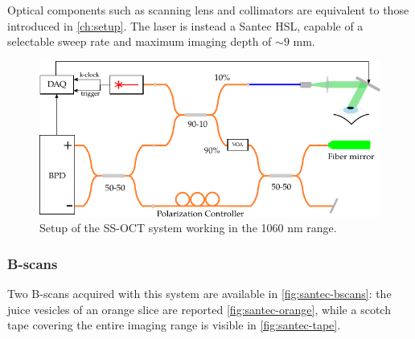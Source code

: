 Optical components such as scanning lens and collimators are equivalent to those introduced in \autoref{ch:setup}. The laser is instead a Santec HSL, capable of a selectable sweep rate and maximum imaging depth of $\sim 9$ mm. 


\begin{figure}[H]
	\centering
	\includegraphics[width=\linewidth]{gfx/ch4//santec-setup}
	\caption{Setup of the SS-OCT system working in the 1060 nm range.}\label{fig:santec-setup}
\end{figure}

\subsubsection{B-scans}

Two B-scans acquired with this system are available in \autoref{fig:santec-bscans}: the juice vesicles of an orange slice are reported \autoref{fig:santec-orange}, while a scotch tape covering the entire imaging range is visible in \autoref{fig:santec-tape}. 

